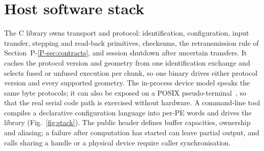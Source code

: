 \section{Host software stack}

The C library owns transport and protocol: identification, configuration,
input transfer, stepping and read-back primitives, checksums, the
retransmission rule of Section~P-\ref{P-sec:contracts}, and session shutdown
after uncertain transfers. It caches the protocol version and geometry from
one identification exchange and selects fused or unfused execution per
chunk, so one binary drives either protocol version and every supported
geometry. The in-process device model speaks the same byte protocols; it can
also be exposed on a POSIX pseudo-terminal~\cite{stevens-apue}, so that the
real serial code path is exercised without hardware. A command-line tool
compiles a declarative configuration language into per-PE words and drives
the library (Fig.~\ref{fig:stack}). The public header defines buffer
capacities, ownership and aliasing; a failure after computation has started
can leave partial output, and calls sharing a handle or a physical device
require caller synchronisation.


